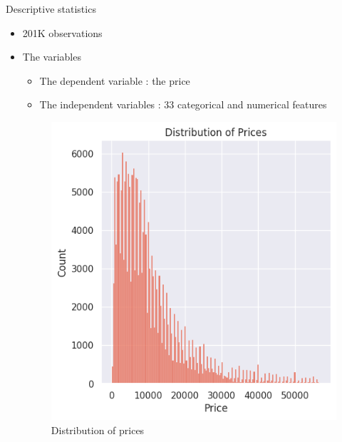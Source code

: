 \documentclass{beamer}
\begin{document}
    \begin{frame}{Descriptive statistics} 
        \begin{itemize}
        \item 201K observations \\[0.2 cm]
        \item The variables \\[0.2 cm]
        \begin{itemize}
            \item The dependent variable : the price \\[0.1 cm]
            
            \item The independent variables : 33 categorical and numerical features \\[0.1 cm]
        \end{itemize}
        \begin{figure}
         
        \includegraphics[width=0.4\linewidth]{distribution of prices.png}
        \caption{Distribution of prices}
        \end{figure}
    \end{itemize}
    \end{frame}

    
\end{document}

